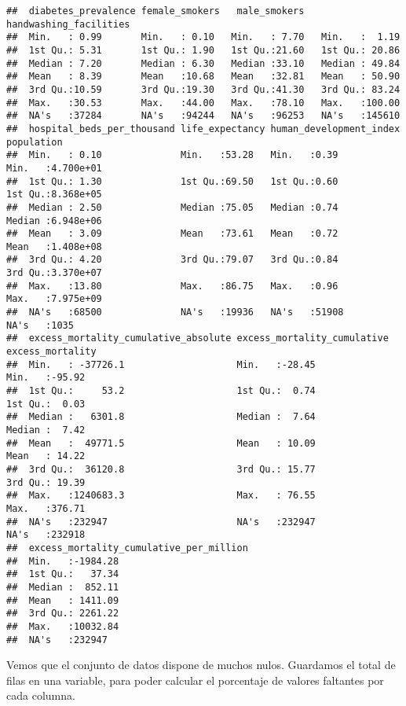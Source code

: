 \documentclass[
]{article}
\begin{document}
\begin{verbatim}
##  diabetes_prevalence female_smokers   male_smokers   handwashing_facilities
##  Min.   : 0.99       Min.   : 0.10   Min.   : 7.70   Min.   :  1.19        
##  1st Qu.: 5.31       1st Qu.: 1.90   1st Qu.:21.60   1st Qu.: 20.86        
##  Median : 7.20       Median : 6.30   Median :33.10   Median : 49.84        
##  Mean   : 8.39       Mean   :10.68   Mean   :32.81   Mean   : 50.90        
##  3rd Qu.:10.59       3rd Qu.:19.30   3rd Qu.:41.30   3rd Qu.: 83.24        
##  Max.   :30.53       Max.   :44.00   Max.   :78.10   Max.   :100.00        
##  NA's   :37284       NA's   :94244   NA's   :96253   NA's   :145610        
##  hospital_beds_per_thousand life_expectancy human_development_index   population       
##  Min.   : 0.10              Min.   :53.28   Min.   :0.39            Min.   :4.700e+01  
##  1st Qu.: 1.30              1st Qu.:69.50   1st Qu.:0.60            1st Qu.:8.368e+05  
##  Median : 2.50              Median :75.05   Median :0.74            Median :6.948e+06  
##  Mean   : 3.09              Mean   :73.61   Mean   :0.72            Mean   :1.408e+08  
##  3rd Qu.: 4.20              3rd Qu.:79.07   3rd Qu.:0.84            3rd Qu.:3.370e+07  
##  Max.   :13.80              Max.   :86.75   Max.   :0.96            Max.   :7.975e+09  
##  NA's   :68500              NA's   :19936   NA's   :51908           NA's   :1035       
##  excess_mortality_cumulative_absolute excess_mortality_cumulative excess_mortality
##  Min.   : -37726.1                    Min.   :-28.45              Min.   :-95.92  
##  1st Qu.:     53.2                    1st Qu.:  0.74              1st Qu.:  0.03  
##  Median :   6301.8                    Median :  7.64              Median :  7.42  
##  Mean   :  49771.5                    Mean   : 10.09              Mean   : 14.22  
##  3rd Qu.:  36120.8                    3rd Qu.: 15.77              3rd Qu.: 19.39  
##  Max.   :1240683.3                    Max.   : 76.55              Max.   :376.71  
##  NA's   :232947                       NA's   :232947              NA's   :232918  
##  excess_mortality_cumulative_per_million
##  Min.   :-1984.28                       
##  1st Qu.:   37.34                       
##  Median :  852.11                       
##  Mean   : 1411.09                       
##  3rd Qu.: 2261.22                       
##  Max.   :10032.84                       
##  NA's   :232947
\end{verbatim}

Vemos que el conjunto de datos dispone de muchos nulos. Guardamos el
total de filas en una variable, para poder calcular el porcentaje de
valores faltantes por cada columna.
\end{document}
